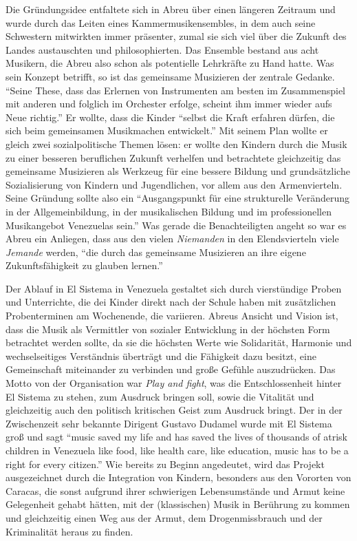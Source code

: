 Die Gründungsidee entfaltete sich in Abreu über einen längeren
Zeitraum und wurde durch das Leiten eines Kammermusikensembles, in dem auch
seine Schwestern mitwirkten immer präsenter, zumal sie sich viel über die
Zukunft des Landes austauschten und philosophierten. Das Ensemble bestand aus
acht Musikern, die Abreu also schon als potentielle Lehrkräfte zu Hand hatte.
\autocite[34]{kaufmann:el_sistema} Was sein Konzept betrifft, so ist das
gemeinsame Musizieren der zentrale Gedanke. \enquote{Seine These, dass das
Erlernen von Instrumenten am besten im Zusammenspiel mit anderen und folglich im
Orchester erfolge, scheint ihm immer wieder aufs Neue
richtig.}\autocite[34]{kaufmann:el_sistema} Er wollte, dass die Kinder
\enquote{selbst die Kraft erfahren dürfen, die sich beim gemeinsamen Musikmachen
entwickelt.}\autocite[34]{kaufmann:el_sistema} Mit seinem Plan wollte er gleich
zwei sozialpolitische Themen lösen: er wollte den Kindern durch die Musik zu
einer besseren beruflichen Zukunft verhelfen und betrachtete gleichzeitig das
gemeinsame Musizieren als Werkzeug für eine bessere Bildung und grundsätzliche
Sozialisierung von Kindern und Jugendlichen, vor allem aus den Armenvierteln.
Seine Gründung sollte also ein \enquote{Ausgangspunkt für eine strukturelle
Veränderung in der Allgemeinbildung, in der musikalischen Bildung und im
professionellen Musikangebot Venezuelas sein.}\autocite[38]{kaufmann:el_sistema}
Was gerade die Benachteiligten angeht so war es Abreu ein Anliegen, dass aus den
vielen \emph{Niemanden} in den Elendsvierteln viele \emph{Jemande} werden, \enquote{die durch
das gemeinsame Musizieren an ihre eigene Zukunftsfähigkeit zu glauben
lernen.}\autocite[39]{kaufmann:el_sistema}

Der Ablauf in El Sistema in Venezuela gestaltet sich durch vierstündige Proben
und Unterrichte, die dei Kinder direkt nach der Schule haben mit zusätzlichen
Probenterminen am Wochenende, die variieren. Abreus Ansicht und Vision ist, dass
die Musik als Vermittler von sozialer Entwicklung in der höchsten Form
betrachtet werden sollte, da sie die höchsten Werte wie Solidarität, Harmonie
und wechselseitiges Verständnis überträgt und die Fähigkeit dazu besitzt, eine
Gemeinschaft miteinander zu verbinden und große Gefühle auszudrücken. Das Motto
von der Organisation war \emph{Play and fight}, was die Entschlossenheit hinter
El Sistema zu stehen, zum Ausdruck bringen soll, sowie die Vitalität und
gleichzeitig auch den politisch kritischen Geist zum Ausdruck bringt. Der in der
Zwischenzeit sehr bekannte Dirigent Gustavo Dudamel wurde mit El Sistema groß
und sagt \enquote{music saved my life and has saved the lives of thousands of
atrisk children in Venezuela \textelp{} like food, like health care, like education,
music has to be a right for every citizen.}\autocite{wikipedia:el_sistema} Wie
bereits zu Beginn angedeutet, wird das Projekt ausgezeichnet durch die
Integration von Kindern, besonders aus den Vororten von Caracas, die sonst
aufgrund ihrer schwierigen Lebensumstände und Armut keine Gelegenheit gehabt
hätten, mit der (klassischen) Musik in Berührung zu kommen und gleichzeitig
einen Weg aus der Armut, dem Drogenmissbrauch und der Kriminalität heraus zu
finden.

